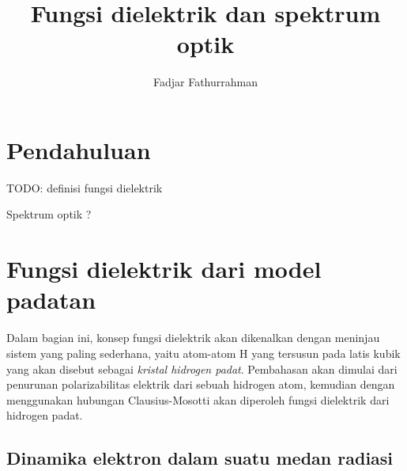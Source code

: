 \documentclass[a4paper,bahasa]{paper}
\begin{document}
\title{Fungsi dielektrik dan spektrum optik}
\author{Fadjar Fathurrahman}
\date{}
\maketitle

\section{Pendahuluan}

TODO: definisi fungsi dielektrik

Spektrum optik ?

\section{Fungsi dielektrik dari model padatan}

Dalam bagian ini, konsep fungsi dielektrik akan dikenalkan dengan meninjau
sistem yang paling sederhana, yaitu atom-atom H yang tersusun pada latis kubik
yang akan disebut sebagai \textit{kristal hidrogen padat}.
Pembahasan akan dimulai dari penurunan polarizabilitas elektrik dari sebuah
hidrogen atom, kemudian dengan menggunakan hubungan Clausius-Mosotti akan
diperoleh fungsi dielektrik dari hidrogen padat.

\subsection{Dinamika elektron dalam suatu medan radiasi}
\end{document}
